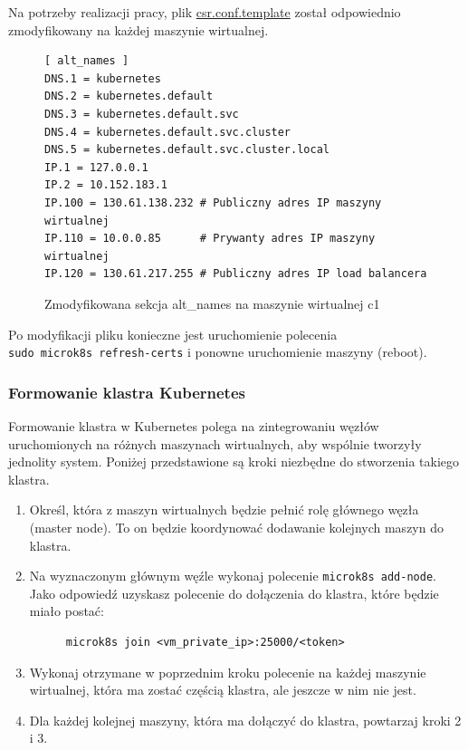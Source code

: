 Na potrzeby realizacji pracy, plik \url{csr.conf.template} został odpowiednio zmodyfikowany na każdej maszynie wirtualnej.

\begin{figure}[H]
    \begin{verbatim}
[ alt_names ]
DNS.1 = kubernetes
DNS.2 = kubernetes.default
DNS.3 = kubernetes.default.svc
DNS.4 = kubernetes.default.svc.cluster
DNS.5 = kubernetes.default.svc.cluster.local
IP.1 = 127.0.0.1
IP.2 = 10.152.183.1
IP.100 = 130.61.138.232 # Publiczny adres IP maszyny wirtualnej
IP.110 = 10.0.0.85      # Prywanty adres IP maszyny wirtualnej
IP.120 = 130.61.217.255 # Publiczny adres IP load balancera
    \end{verbatim}
    \caption{Zmodyfikowana sekcja alt\_names na maszynie wirtualnej c1}
    \label{fig:zmodyfikowana-konfiguracja-alt-names}
\end{figure}

Po modyfikacji pliku konieczne jest uruchomienie polecenia \\\texttt{sudo microk8s refresh-certs} i ponowne uruchomienie maszyny (reboot).

\subsubsection{Formowanie klastra Kubernetes}

Formowanie klastra w Kubernetes polega na zintegrowaniu węzłów uruchomionych na różnych maszynach wirtualnych, aby wspólnie tworzyły jednolity system. Poniżej przedstawione są kroki niezbędne do stworzenia takiego klastra.

\begin{enumerate}
    \item Określ, która z maszyn wirtualnych będzie pełnić rolę głównego węzła (master node). To on będzie koordynować dodawanie kolejnych maszyn do klastra.
    \item Na wyznaczonym głównym węźle wykonaj polecenie \texttt{microk8s add-node}. Jako odpowiedź uzyskasz polecenie do dołączenia do klastra, które będzie miało postać:
    \begin{figure}[H]
        \begin{verbatim}
microk8s join <vm_private_ip>:25000/<token>
        \end{verbatim}
        \label{fig:join-cluster-command}
    \end{figure}
    \item Wykonaj otrzymane w poprzednim kroku polecenie na każdej maszynie wirtualnej, która ma zostać częścią klastra, ale jeszcze w nim nie jest.
    \item Dla każdej kolejnej maszyny, która ma dołączyć do klastra, powtarzaj kroki 2 i 3.
\end{enumerate}

